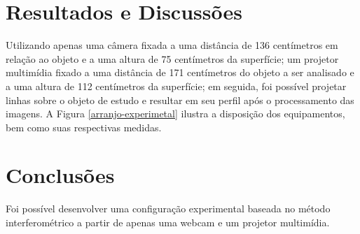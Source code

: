 \documentclass[a4paper, 12pt]{article}
\begin{document}
\section{Resultados e Discussões}

Utilizando apenas uma câmera fixada a uma distância de 136 centímetros em relação ao objeto e a uma altura de 75 centímetros da superfície; um projetor multimídia fixado a uma distância de 171 centímetros do objeto a ser analisado e a uma altura de 112 centímetros da superfície; em seguida, foi possível projetar linhas sobre o objeto de estudo e resultar em seu perfil após o processamento das imagens. A Figura \ref{arranjo-experimetal} ilustra a disposição dos equipamentos, bem como suas respectivas medidas.

\section{Conclusões}


Foi possível desenvolver uma configuração experimental baseada no método interferométrico a partir de apenas uma webcam e um projetor multimídia. 


\printbibliography
\end{document}
